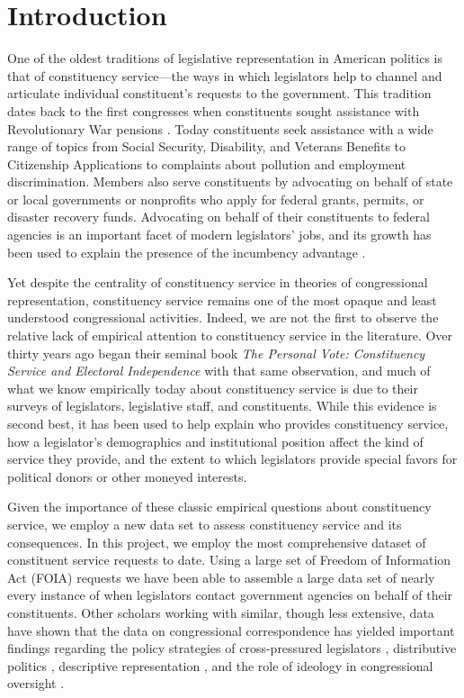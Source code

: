 \documentclass{article}
\begin{document}
\section{Introduction}
One of the oldest traditions of legislative representation in American politics is that of constituency service---the ways in which legislators help to channel and articulate individual constituent's requests to the government.  This tradition dates back to the first congresses when constituents sought assistance with Revolutionary War pensions \citep{Eckman2017}. Today constituents seek assistance with a wide range of topics from Social Security, Disability, and Veterans Benefits to Citizenship Applications to complaints about pollution and employment discrimination. Members also serve constituents by advocating on behalf of state or local governments or nonprofits who apply for federal grants, permits, or disaster recovery funds. %
Advocating on behalf of their constituents to federal agencies is an important facet of modern legislators' jobs, and its growth has been used to explain the presence of the incumbency advantage \citep{King1991}.  

Yet despite the centrality of constituency service in theories of congressional representation, constituency service remains one of the most opaque and least understood congressional activities. Indeed, we are not the first to observe the relative lack of empirical attention to constituency service in the literature.  Over thirty years ago \citet*{CainFerejohnFiorina1987} began their seminal book \emph{The Personal Vote: Constituency Service and Electoral Independence} with that same observation, and much of what we know empirically today about constituency service is due to their surveys of legislators, legislative staff, and constituents.  While this evidence is second best, it has been used to help explain who provides constituency service, how a legislator's demographics and institutional position affect the kind of service they provide, and the extent to which legislators provide special favors for political donors or other moneyed interests.  

Given the importance of these classic empirical questions about constituency service, we employ a new data set to assess constituency service and its consequences.  In this project, we employ the most comprehensive dataset of constituent service requests to date.  Using a large set of Freedom of Information Act (FOIA) requests we have been able to assemble a large data set of nearly every instance of when legislators contact government agencies on behalf of their constituents.  Other scholars working with similar, though less extensive, data have shown that the data on congressional correspondence has yielded important findings regarding the policy strategies of cross-pressured legislators \citep{Ritchie2017}, distributive politics \citep{MillsKalafHuges2015}, descriptive representation \citep{LowandeRitchieLauterbach2018}, and the role of ideology in congressional oversight \citep{Lowande2018JOP}.  
\end{document}
